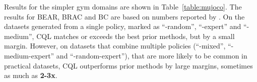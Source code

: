Results for the simpler gym domains are shown in Table~\ref{table:mujoco}. The results for BEAR, BRAC and BC are based on numbers reported by \citet{d4rl}. On the datasets generated from a single policy, marked as ``-random'', ``-expert'' and ``-medium'', CQL matches or exceeds the best prior methods, but by a small margin. However, on datasets that combine multiple policies (``-mixed'', ``-medium-expert'' and ``-random-expert''), that are more likely to be common in practical datasets, CQL outperforms prior methods by large margins, sometimes as much as \textbf{2-3x}.  




